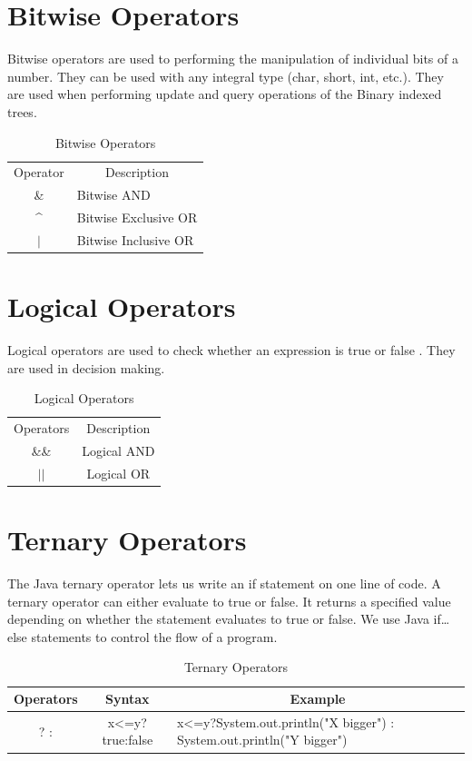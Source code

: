 \documentclass[A4 paper,openany]{book}  %
\begin{document}
\section{Bitwise Operators}
Bitwise operators\cite{Ref8} are used to performing the manipulation of individual bits of a number.
They can be used with any integral type (char, short, int, etc.). They are used when performing update and query operations of the Binary indexed trees.
% 
%
\begin{table}[htbp]
    \begin{tabular}{cl}
        Operator           & \multicolumn{1}{c}{Description} \\
        \&                 & Bitwise AND                     \\
        \textasciicircum{} & Bitwise Exclusive OR            \\
        $\vert$            & Bitwise Inclusive OR
    \end{tabular}
    \centering
    \caption{Bitwise Operators}
\end{table}
% 
% 
\section{Logical Operators}
Logical operators\cite{Ref8} are used to check whether an expression is true or false . They are used in decision making.
% 
%
\begin{table}[htbp]
    \begin{tabular}{cc}
        Operators      & Description \\
        \&\&           & Logical AND \\
        $\vert$$\vert$ & Logical OR
    \end{tabular}
    \centering
    \caption{Logical Operators}
\end{table}
% 
% 
\section{Ternary Operators}
The Java ternary operator\cite{Ref8} lets us write an if statement on one line of code.
A ternary operator can either evaluate to true or false.
It returns a specified value depending on whether the statement evaluates to true or false. We use Java if…else statements to control the flow of a program.
% 
%
\begin{table}[htbp]
    \begin{tabular}{|c|c|l|}
        \hline
        Operators & Syntax                    & \multicolumn{1}{c|}{Example}                                                   \\ \hline
        ? :       & x\textless{}=y?true:false & x\textless{}=y?System.out.println("X bigger") : System.out.println("Y bigger") \\ \hline
    \end{tabular}
    \begin{center}
        \caption{Ternary Operators}
    \end{center}
\end{table}
% 
% 
\end{document}
